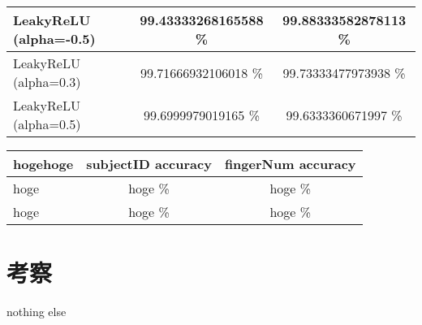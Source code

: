 \documentclass[a4paper, 11pt, titlepage]{jsarticle}
\begin{document}
\begin{table}[htb]
  \begin{tabular}{|l|c|c|}
    \hline
    LeakyReLU (alpha=-0.5) & 99.43333268165588 \% & 99.88333582878113 \% \\ \hline
    LeakyReLU (alpha=0.3) & 99.71666932106018 \% & 99.73333477973938 \% \\ \hline
    LeakyReLU (alpha=0.5) & 99.6999979019165 \% & 99.6333360671997 \% \\ \hline
  \end{tabular}
\end{table}

\begin{table}[htb]
  \begin{tabular}{|l|c|c|}
    \hline
    hogehoge & subjectID accuracy & fingerNum accuracy  \\ \hline
    hoge & hoge \% & hoge \% \\ \hline
    hoge & hoge \% & hoge \% \\ \hline
  \end{tabular}
\end{table}




\section{考察}
nothing else
\end{document}
